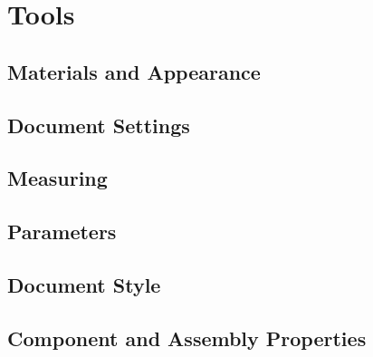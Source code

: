 \chapter{Tools}

\section{Materials and Appearance}

\section{Document Settings}

\section{Measuring}

\section{Parameters}

\section{Document Style}

\section{Component and Assembly Properties}